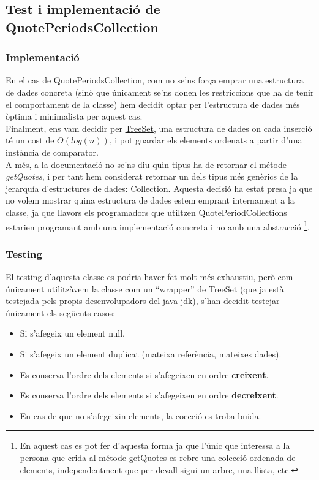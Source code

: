 \documentclass[12pt, letterpaper]{article}
\begin{document}
\subsection{Test i implementació de QuotePeriodsCollection}
\label{QuotePeriodsCollection}

\subsubsection{Implementació}
En el cas de QuotePeriodsCollection, com no se'ns força emprar una estructura de dades concreta (sinò que únicament se'ns donen les restriccions que ha de tenir el comportament de la classe) hem decidit optar per l'estructura de dades més òptima i minimalista per aquest cas.\\

Finalment, ens vam decidir per \href{https://docs.oracle.com/javase/7/docs/api/java/util/TreeSet.html}{TreeSet}, una estructura de dades on cada inserció té un cost de $O(log(n))$, i pot guardar els elements ordenats a partir d'una instància de comparator. \\

A més, a la documentació no se'ns diu quin tipus ha de retornar el métode \textit{getQuotes}, i per tant hem considerat retornar un dels tipus més genèrics de la jerarquía d'estructures de dades: Collection. Aquesta decisió ha estat presa ja que no volem mostrar quina estructura de dades estem emprant internament a la classe, ja que llavors els programadors que utiltzen QuotePeriodCollections estarien programant amb una implementació concreta i no amb una abstracció \footnote{En aquest cas es pot fer d'aquesta forma ja que l'únic que interessa a la persona que crida al métode getQuotes es rebre una colecció ordenada de elements, independentment que per devall sigui un arbre, una llista, etc.}.

\subsubsection{Testing}
El testing d'aquesta classe es podria haver fet molt més exhaustiu, però com únicament utilitzàvem la classe com un ``wrapper'' de TreeSet (que ja està testejada pels propis desenvolupadors del java jdk), s'han decidit testejar únicament els següents casos:
\begin{itemize}
  \item Si s'afegeix un element null.
  \item Si s'afegeix un element duplicat (mateixa referència, mateixes dades).
  \item Es conserva l'ordre dels elements si s'afegeixen en ordre \textbf{creixent}.
  \item Es conserva l'ordre dels elements si s'afegeixen en ordre \textbf{decreixent}.
  \item En cas de que no s'afegeixin elements, la co\lgem ecció es troba buida.
\end{itemize}
\end{document}
